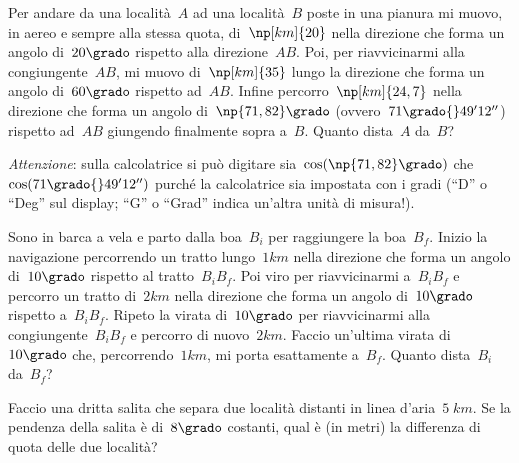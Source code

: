 \begin{multicols}{2}
\begin{esercizio}[\Ast]
\label{ese:G.43}
Per andare da una località~$A$ ad una località~$B$ poste in una pianura mi muovo, in aereo e sempre alla stessa quota, di~$\np[km]{20}$
nella direzione che forma un angolo di~$20\grado$ rispetto alla direzione~$AB$. Poi, per riavvicinarmi alla congiungente~$AB$,
mi muovo di~$\np[km]{35}$ lungo la direzione che forma un angolo di~$60\grado$ rispetto ad~$AB$. Infine percorro~$\np[km]{24,7}$
nella direzione che forma un angolo di~$\np{71,82}\grado$ (ovvero~$71\grado{}49'12''$) rispetto ad~$AB$ giungendo finalmente sopra a~$B$.
Quanto dista~$A$ da~$B$?

\emph{Attenzione}: sulla calcolatrice si può digitare sia~$\cos(\np{71,82}\grado)$ che~$\cos(71\grado{}49' 12'')$ purché la calcolatrice sia
impostata con i gradi (``D'' o ``Deg'' sul display; ``G'' o ``Grad'' indica un'altra unità di misura!).

\begin{center}
 
\end{center}
\end{esercizio}
\end{multicols}
\begin{esercizio}[\Ast]
\label{ese:G.44}
Sono in barca a vela e parto dalla boa~$B_i$ per raggiungere la boa~$B_f$. Inizio la navigazione percorrendo un tratto lungo~$1\unit{km}$
nella direzione che forma un angolo di~$10\grado$ rispetto al tratto~$B_i B_f$. Poi viro per riavvicinarmi a~$B_i B_f$ e percorro un tratto
di~$2\unit{km}$ nella direzione che forma un angolo di~$10\grado$ rispetto a~$B_i B_f$. Ripeto la virata di~$10\grado$ per
riavvicinarmi alla congiungente~$B_i B_f$ e percorro di nuovo~$2\unit{km}$. Faccio un'ultima virata di~$10\grado$ che, percorrendo~$1\unit{km}$,
mi porta esattamente a~$B_f$. Quanto dista~$B_i$ da~$B_f$?
\pagebreak
\begin{center}
 
\end{center}
\end{esercizio}

\begin{esercizio}[\Ast]
\label{ese:G.45}
Faccio una dritta salita che separa due località distanti in linea d'aria~$5\;\unit{km}$. Se la pendenza della salita è di~$8\grado$ costanti,
qual è (in metri) la differenza di quota delle due località?
\end{esercizio}

